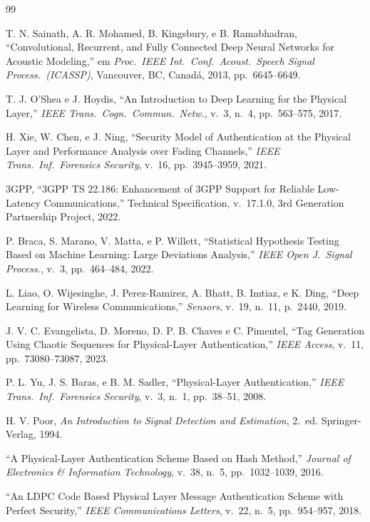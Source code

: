 \documentclass[12pt,a4paper]{article}
\begin{document}
\begin{thebibliography}{99}

 T. N. Sainath, A. R. Mohamed, B. Kingsbury, e B. Ramabhadran, ``Convolutional, Recurrent, and Fully Connected Deep Neural Networks for Acoustic Modeling,'' em \textit{Proc.\ IEEE Int.\ Conf.\ Acoust.\ Speech Signal Process.\ (ICASSP)}, Vancouver, BC, Canadá, 2013, pp.~6645--6649.

 T. J. O'Shea e J. Hoydis, ``An Introduction to Deep Learning for the Physical Layer,'' \textit{IEEE Trans.\ Cogn.\ Commun.\ Netw.}, v.~3, n.~4, pp.~563--575, 2017.

 H. Xie, W. Chen, e J. Ning, ``Security Model of Authentication at the Physical Layer and Performance Analysis over Fading Channels,'' \textit{IEEE Trans.\ Inf.\ Forensics Security}, v.~16, pp.~3945--3959, 2021.

 3GPP, ``3GPP TS 22.186: Enhancement of 3GPP Support for Reliable Low-Latency Communications,'' Technical Specification, v.~17.1.0, 3rd Generation Partnership Project, 2022.

 P. Braca, S. Marano, V. Matta, e P. Willett, ``Statistical Hypothesis Testing Based on Machine Learning: Large Deviations Analysis,'' \textit{IEEE Open J.\ Signal Process.}, v.~3, pp.~464--484, 2022.

 L. Liao, O. Wijesinghe, J. Perez-Ramirez, A. Bhatt, B. Imtiaz, e K. Ding, ``Deep Learning for Wireless Communications,'' \textit{Sensors}, v.~19, n.~11, p.~2440, 2019.

 J. V. C. Evangelista, D. Moreno, D. P. B. Chaves e C. Pimentel, ``Tag Generation Using Chaotic Sequences for Physical-Layer Authentication,'' \textit{IEEE Access}, v.~11, pp.~73080--73087, 2023.

 P. L. Yu, J. S. Baras, e B. M. Sadler, ``Physical-Layer Authentication,'' \textit{IEEE Trans.\ Inf.\ Forensics Security}, v.~3, n.~1, pp.~38--51, 2008.

 H. V. Poor, \textit{An Introduction to Signal Detection and Estimation}, 2.~ed. Springer-Verlag, 1994.

 ``A Physical-Layer Authentication Scheme Based on Hash Method,'' \textit{Journal of Electronics \& Information Technology}, v.~38, n.~5, pp.~1032--1039, 2016.

 ``An LDPC Code Based Physical Layer Message Authentication Scheme with Perfect Security,'' \textit{IEEE Communications Letters}, v.~22, n.~5, pp.~954--957, 2018.


\end{thebibliography}
\end{document}
